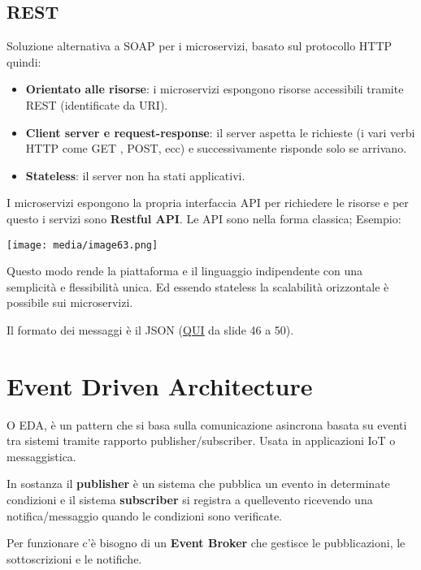\subsection{REST}\label{rest}

Soluzione alternativa a SOAP per i microservizi, basato sul protocollo
HTTP quindi:

\begin{itemize}
\item
  \textbf{Orientato alle risorse}: i microservizi espongono risorse
  accessibili tramite REST (identificate da URI).
\item
  \textbf{Client server e request-response}: il server aspetta le
  richieste (i vari verbi HTTP come GET , POST, ecc) e successivamente
  risponde solo se arrivano.
\item
  \textbf{Stateless}: il server non ha stati applicativi.
\end{itemize}

I microservizi espongono la propria interfaccia API per richiedere le
risorse e per questo i servizi sono \textbf{Restful API}. Le API sono
nella forma classica; Esempio:

\texttt{[image: media/image63.png]}

Questo modo rende la piattaforma e il linguaggio indipendente con una
semplicità e flessibilità unica. Ed essendo stateless la scalabilità
orizzontale è possibile sui microservizi.

Il formato dei messaggi è il JSON
(\href{https://virtuale.unibo.it/pluginfile.php/2036712/mod_resource/content/1/Lezione\%206\%20-\%20Architetture\%20Moderne.pdf}{\ul{QUI}}
da slide 46 a 50).

\section{Event Driven Architecture}\label{event-driven-architecture}

O EDA, è un pattern che si basa sulla comunicazione asincrona basata su
eventi tra sistemi tramite rapporto publisher/subscriber. Usata in
applicazioni IoT o messaggistica.

In sostanza il \textbf{publisher} è un sistema che pubblica un evento in
determinate condizioni e il sistema \textbf{subscriber} si registra a
quell\textquotesingle evento ricevendo una notifica/messaggio quando le
condizioni sono verificate.

Per funzionare c'è bisogno di un \textbf{Event Broker} che gestisce le
pubblicazioni, le sottoscrizioni e le notifiche.

